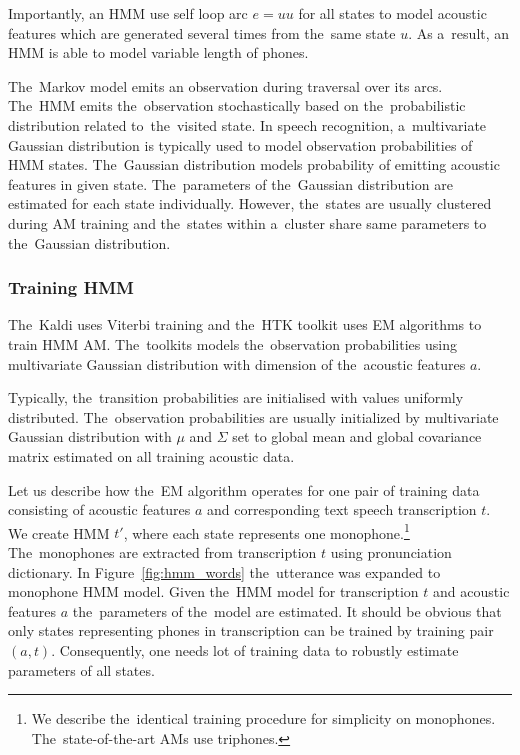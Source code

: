 Importantly, an \ac{HMM} use self loop arc $e=uu$ for all states to model acoustic features which are generated several times from the~same state $u$.
As a~result, an \ac{HMM} is able to model variable length of phones.


The~Markov model emits an observation during traversal over its arcs.
The~\acl{HMM} emits the~observation stochastically based on the~probabilistic distribution related to~the~visited state.
In speech recognition, a~multivariate Gaussian distribution is typically used to model observation probabilities of \ac{HMM} states.
The~Gaussian distribution models probability of emitting acoustic features in given state.
The~parameters of the~Gaussian distribution are estimated for each state individually.
However, the~states are usually clustered during \ac{AM} training and the~states within a~cluster share same parameters to the~Gaussian distribution.


\subsubsection*{Training \ac{HMM}}
\label{sub:trainhmm}

The~Kaldi uses Viterbi training and the~\ac{HTK} toolkit uses \acl{EM} algorithms to train \ac{HMM} \acl{AM}.
The~toolkits models the~observation probabilities using multivariate Gaussian distribution with dimension of the~acoustic features $a$.

Typically, the~transition probabilities are initialised with values uniformly distributed.
The~observation probabilities are usually initialized by multivariate Gaussian distribution with $\mu$ and $\Sigma$ set to global mean and global covariance matrix estimated on all training acoustic data.

Let us describe how the~\ac{EM} algorithm operates for one pair of training data consisting of acoustic features $a$ and corresponding text speech transcription $t$.
We create \ac{HMM} $t'$, where each state represents one monophone.\footnote{We describe the~identical training procedure for simplicity on monophones. The~state-of-the-art \acp{AM} use triphones.} 
The~monophones are extracted from transcription $t$ using pronunciation dictionary.
In Figure~\ref{fig:hmm_words} the~utterance  was expanded to monophone \ac{HMM} model.
Given the~\ac{HMM} model for transcription $t$ and acoustic features $a$ the~parameters of the~model are estimated.
It should be obvious that only states representing phones in transcription can be trained by training pair $(a, t)$.
Consequently, one needs lot of training data to robustly estimate parameters of all states.

